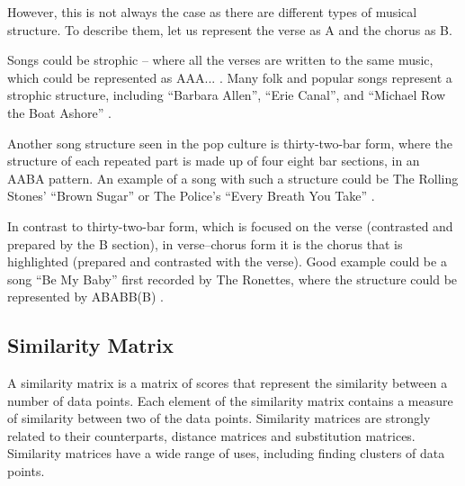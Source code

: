 However, this is not always the case as there are different types of musical structure. To describe them, let us represent the verse as A and the chorus as B. 

Songs could be strophic -- where all the verses are written to the same music, which could be represented as AAA... . Many folk and popular songs represent a strophic structure, including ``Barbara Allen'', ``Erie Canal'', and ``Michael Row the Boat Ashore'' \cite{strophic}.

Another song structure seen in the pop culture is thirty-two-bar form, where the structure of each repeated part is made up of four eight bar sections, in an AABA pattern. An example of a song with such a structure could be The Rolling Stones' ``Brown Sugar'' or The Police's ``Every Breath You Take'' \cite{32bar}. 

In contrast to thirty-two-bar form, which is focused on the verse (contrasted and prepared by the B section), in verse–chorus form it is the chorus that is highlighted (prepared and contrasted with the verse). Good example could be a song ``Be My Baby'' first recorded by The Ronettes, where the structure could be represented by ABABB(B) \cite{32bar}.



\subsection{Similarity Matrix}

A similarity matrix is a matrix of scores that represent the similarity between a number of data points. Each element of the similarity matrix contains a measure of similarity between two of the data points. Similarity matrices are strongly related to their counterparts, distance matrices and substitution matrices.
Similarity matrices have a wide range of uses, including finding clusters of data points.


